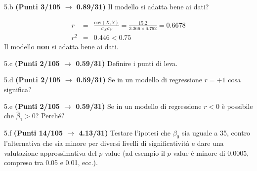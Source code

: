 \documentclass[
  11pt,
]{book}
\theoremstyle{mytheoremstyle}
\theoremstyle{mydefstyle}
\newenvironment{sol}
  {
  \begin{tcolorbox}[enhanced,breakable,arc=0.1mm,boxrule=1pt,colback=white,colframe=iblue,
  title=\bf \fontfamily{lmss}\selectfont \hspace{.5 cm} Soluzione,drop fuzzy shadow]

}{
\end{tcolorbox}
  }
\begin{document}
5.b \textbf{(Punti 3/105 \(\rightarrow\) 0.89/31)} Il modello si adatta bene ai dati?

\begin{sol}
\begin{eqnarray*}
r&=&\frac{\text{cov}(X,Y)}{\sigma_X\sigma_Y}=\frac{ 15.2 }{ 3.366 \times 6.762 }= 0.6678 \\r^2&=& 0.446 < 0.75
\end{eqnarray*}
Il modello \textbf{non} si adatta bene ai dati.

\end{sol}

5.c \textbf{(Punti 2/105 \(\rightarrow\) 0.59/31)} Definire i punti di leva.

5.d \textbf{(Punti 2/105 \(\rightarrow\) 0.59/31)} Se in un modello di regressione \(r=+1\) cosa significa?

5.e \textbf{(Punti 2/105 \(\rightarrow\) 0.59/31)} Se in un modello di regressione \(r<0\) è possibile che \(\hat\beta_1>0\)? Perché?

5.f \textbf{(Punti 14/105 \(\rightarrow\) 4.13/31)} Testare l'ipotesi che \(\beta_0\) sia uguale a 35, contro l'alternativa che sia minore per diversi livelli di significatività e dare una valutazione approssimativa del \(p\)-value (ad esempio il \(p\)-value è minore di 0.0005, compreso tra 0.05 e 0.01, ecc.).
\end{document}

